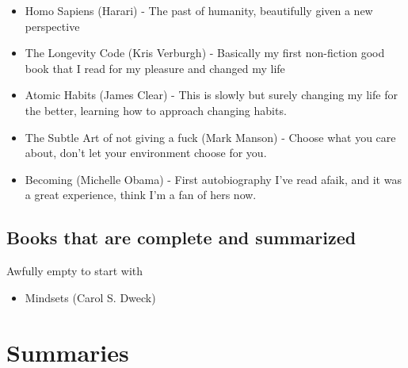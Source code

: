 \documentclass[12pt,a4paper]{article}
\begin{document}
\begin{itemize}
\item Homo Sapiens (Harari) - The past of humanity, beautifully given a new perspective
\item The Longevity Code (Kris Verburgh) - Basically my first non-fiction good book that I read for my pleasure and changed my life
\item Atomic Habits (James Clear) - This is slowly but surely changing my life for the better, learning how to approach changing habits.
\item The Subtle Art of not giving a fuck (Mark Manson) - Choose what you care about, don't let your environment choose for you.
\item Becoming (Michelle Obama) - First autobiography I've read afaik, and it was a great experience, think I'm a fan of hers now.
\end{itemize}

\subsection{Books that are complete and summarized}
Awfully empty to start with
\begin{itemize}
\item  Mindsets (Carol S. Dweck)
\end{itemize}


\section{Summaries}















\end{document}
